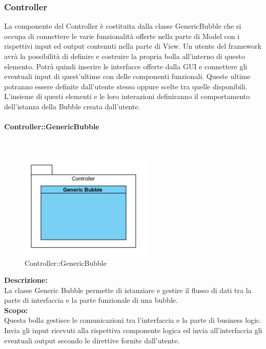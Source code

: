 \subsubsection{Controller}
La componente del Controller è costituita dalla classe Generic\-Bubble che si occupa di connettere le varie funzionalità offerte nella parte di Model con i rispettivi input ed output contenuti nella parte di View. Un utente del framework avrà la possibilità di definire e costruire la propria bolla all’interno di questo elemento. Potrà quindi inserire le interfacce offerte dalla GUI e connettere gli eventuali input di quest’ultime con delle componenti funzionali. Queste ultime potranno essere definite dall’utente stesso oppure scelte tra quelle disponibili. 
L’insieme di questi elementi e le loro interazioni definiranno il comportamento dell’istanza della Bubble creata dall’utente.
\begin{samepage}
\paragraph{Controller\-::Generic\-Bubble}\label{fm-generica}\mbox{}\\
\nopagebreak
\begin{figure}[H]
	\centering
	\includegraphics[height=5cm]{diagrammi_img/classi_e_package/bubble_generica.png}
	\caption{Controller\-::Generic\-Bubble}
\end{figure}
\end{samepage}
\textbf{Descrizione:}\\
La classe Generic Bubble permette di istanziare e gestire il flusso di dati tra la parte di interfaccia e la parte funzionale di una bubble.\\
\textbf{Scopo:}\\
Questa bolla gestisce le comunicazioni tra l’interfaccia e la parte di business logic. Invia gli input ricevuti alla rispettiva componente logica ed invia all’interfaccia gli eventuali output secondo le direttive fornite dall’utente.


